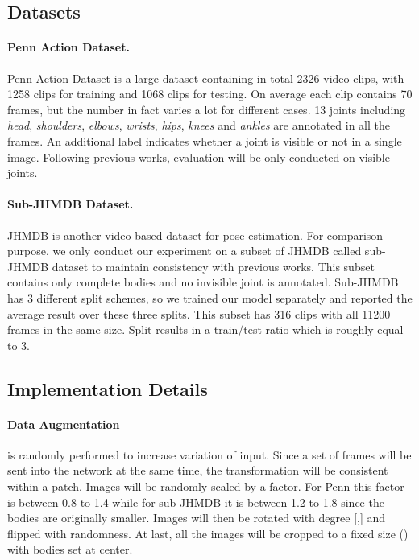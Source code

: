 \documentclass[10pt,twocolumn,letterpaper]{article}
\begin{document}
\subsection{Datasets}
\paragraph{Penn Action Dataset.} Penn Action Dataset \cite{zhang13penn} is a large dataset containing in total 2326 video clips, with 1258 clips for training and 1068 clips for testing. On average each clip contains 70 frames, but the number in fact varies a lot for different cases. 13 joints including \textit{head}, \textit{shoulders}, \textit{elbows}, \textit{wrists}, \textit{hips}, \textit{knees} and \textit{ankles} are annotated in all the frames. An additional label indicates whether a joint is visible or not in a single image. Following previous works, evaluation will be only conducted on visible joints.

\paragraph{Sub-JHMDB Dataset.} JHMDB \cite{jhuang13jhmdb} is another video-based dataset for pose estimation. For comparison purpose, we only conduct our experiment on a subset of JHMDB called sub-JHMDB dataset to maintain consistency with previous works. This subset contains only complete bodies and no invisible joint is annotated. Sub-JHMDB has 3 different split schemes, so we trained our model separately and reported the average result over these three splits. This subset has 316 clips with all 11200 frames in the same size. Split results in a train/test ratio which is roughly equal to 3.

\subsection{Implementation Details}
\paragraph{Data Augmentation} is randomly performed to increase variation of input. Since a set of frames will be sent into the network at the same time, the transformation will be consistent within a patch. Images will be randomly scaled by a factor. For Penn this factor is between 0.8 to 1.4 while for sub-JHMDB it is between 1.2 to 1.8 since the bodies are originally smaller. Images will then be rotated with degree [,] and flipped with randomness. At last, all the images will be cropped to a fixed size () with bodies set at center.
\end{document}
